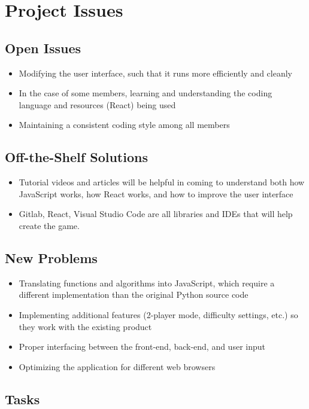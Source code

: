 \documentclass[12pt, titlepage]{article}
\begin{document}
\section{Project Issues}

\subsection{Open Issues}
\begin{itemize}
    \item Modifying the user interface, such that it runs more efficiently and cleanly
    \item In the case of some members, learning and understanding the coding language and resources (React) being used
    \item Maintaining a consistent coding style among all members
\end{itemize}

\subsection{Off-the-Shelf Solutions}
\begin{itemize}
    \item Tutorial videos and articles will be helpful in coming to understand both how JavaScript works, how React works, and how to improve the user interface
    \item Gitlab, React, Visual Studio Code are all libraries and IDEs that will help create the game. 
\end{itemize}

\subsection{New Problems}
\begin{itemize}
    \item Translating functions and algorithms into JavaScript, which require a different implementation than the original Python source code
    \item Implementing additional features (2-player mode, difficulty settings, etc.) so they work with the existing product
    \item Proper interfacing between the front-end, back-end, and user input
    \item Optimizing the application for different web browsers
\end{itemize}

\subsection{Tasks}
\end{document}
